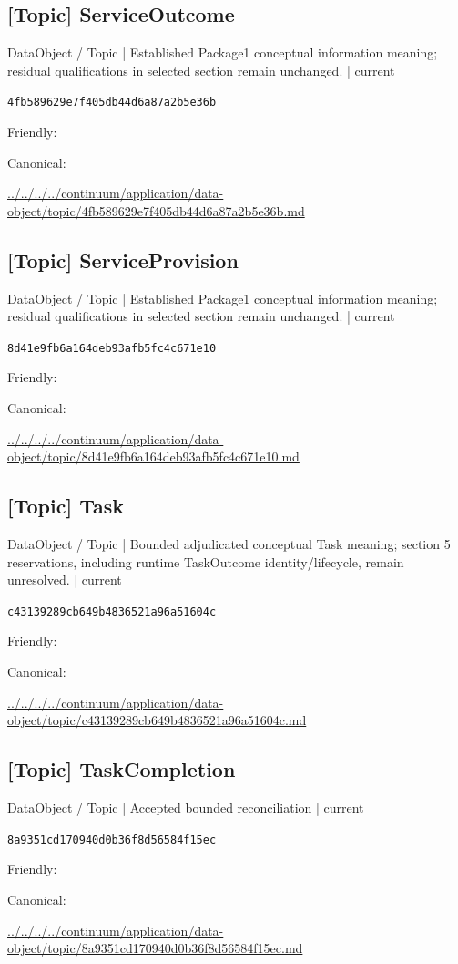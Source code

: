 \documentclass[10pt,a4paper]{article}
\begin{document}
\subsection*{[Topic] ServiceOutcome}
{\small DataObject / Topic | Established Package1 conceptual information meaning; residual qualifications in selected section remain unchanged. | current}\par
\texttt{4fb589629e7f405db44d6a87a2b5e36b}\par
Friendly: \par
Canonical: \par
{\footnotesize\url{../../../../continuum/application/data-object/topic/4fb589629e7f405db44d6a87a2b5e36b.md}}\par
\subsection*{[Topic] ServiceProvision}
{\small DataObject / Topic | Established Package1 conceptual information meaning; residual qualifications in selected section remain unchanged. | current}\par
\texttt{8d41e9fb6a164deb93afb5fc4c671e10}\par
Friendly: \par
Canonical: \par
{\footnotesize\url{../../../../continuum/application/data-object/topic/8d41e9fb6a164deb93afb5fc4c671e10.md}}\par
\subsection*{[Topic] Task}
{\small DataObject / Topic | Bounded adjudicated conceptual Task meaning; section 5 reservations, including runtime TaskOutcome identity/lifecycle, remain unresolved. | current}\par
\texttt{c43139289cb649b4836521a96a51604c}\par
Friendly: \par
Canonical: \par
{\footnotesize\url{../../../../continuum/application/data-object/topic/c43139289cb649b4836521a96a51604c.md}}\par
\subsection*{[Topic] TaskCompletion}
{\small DataObject / Topic | Accepted bounded reconciliation | current}\par
\texttt{8a9351cd170940d0b36f8d56584f15ec}\par
Friendly: \par
Canonical: \par
{\footnotesize\url{../../../../continuum/application/data-object/topic/8a9351cd170940d0b36f8d56584f15ec.md}}\par
\end{document}
